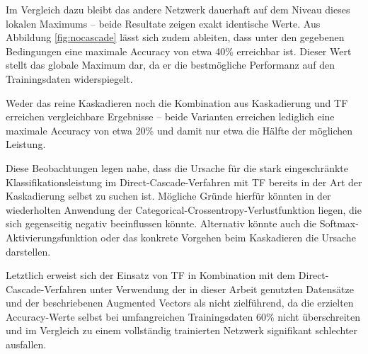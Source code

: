 Im Vergleich dazu bleibt das andere Netzwerk dauerhaft auf dem Niveau dieses lokalen Maximums – beide Resultate zeigen exakt identische Werte. 
Aus Abbildung \ref{fig:nocascade} lässt sich zudem ableiten, dass unter den gegebenen Bedingungen eine maximale Accuracy von etwa 40\% erreichbar 
ist. Dieser Wert stellt das globale Maximum dar, da er die bestmögliche Performanz auf den Trainingsdaten widerspiegelt.

Weder das reine Kaskadieren noch die Kombination aus Kaskadierung und TF erreichen vergleichbare Ergebnisse – beide Varianten 
erreichen lediglich eine maximale Accuracy von etwa 20\% und damit nur etwa die Hälfte der möglichen Leistung.

Diese Beobachtungen legen nahe, dass die Ursache für die stark eingeschränkte Klassifikationsleistung im Direct-Cascade-Verfahren mit 
TF bereits in der Art der Kaskadierung selbst zu suchen ist. Mögliche Gründe hierfür könnten in der wiederholten Anwendung der 
Categorical-Crossentropy-Verlustfunktion liegen, die sich gegenseitig negativ beeinflussen könnte. Alternativ könnte auch die 
Softmax-Aktivierungsfunktion oder das konkrete Vorgehen beim Kaskadieren die Ursache darstellen.

Letztlich erweist sich der Einsatz von TF in Kombination mit dem Direct-Cascade-Verfahren unter Verwendung der in dieser Arbeit 
genutzten Datensätze und der beschriebenen Augmented Vectors als nicht zielführend, da die erzielten Accuracy-Werte selbst bei umfangreichen 
Trainingsdaten 60\% nicht überschreiten und im Vergleich zu einem vollständig trainierten Netzwerk signifikant schlechter ausfallen.
